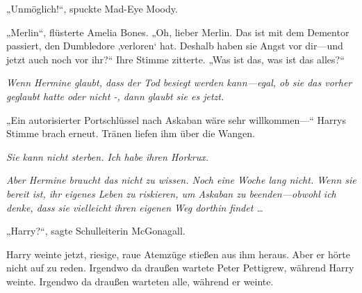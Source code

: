„Unmöglich!“, spuckte Mad-Eye Moody.

„Merlin“, flüsterte Amelia Bones. „Oh, lieber Merlin. Das ist mit dem Dementor passiert, den Dumbledore ‚verloren‘ hat. Deshalb haben sie Angst vor dir—und jetzt auch noch vor ihr?“
Ihre Stimme zitterte.
„Was ist das, was ist das alles?“

\emph{Wenn Hermine glaubt, dass der Tod besiegt werden kann—egal, ob sie das vorher geglaubt hatte oder nicht -, dann glaubt sie es jetzt.
}

„Ein autorisierter Portschlüssel nach Askaban wäre sehr willkommen—“
Harrys Stimme brach erneut.
Tränen liefen ihm über die Wangen.

\emph{Sie kann nicht sterben. Ich habe ihren Horkrux.}



\emph{Aber Hermine braucht das nicht zu wissen. Noch eine Woche lang nicht. Wenn sie bereit ist, ihr eigenes Leben zu riskieren, um Askaban zu beenden—obwohl ich denke, dass sie vielleicht ihren eigenen Weg dorthin findet …}

„Harry?“, sagte Schulleiterin McGonagall.

Harry weinte jetzt, riesige, raue Atemzüge stießen aus ihm heraus. Aber er hörte nicht auf zu reden.
Irgendwo da draußen wartete Peter Pettigrew, während Harry weinte.
Irgendwo da draußen warteten alle, während er weinte.

